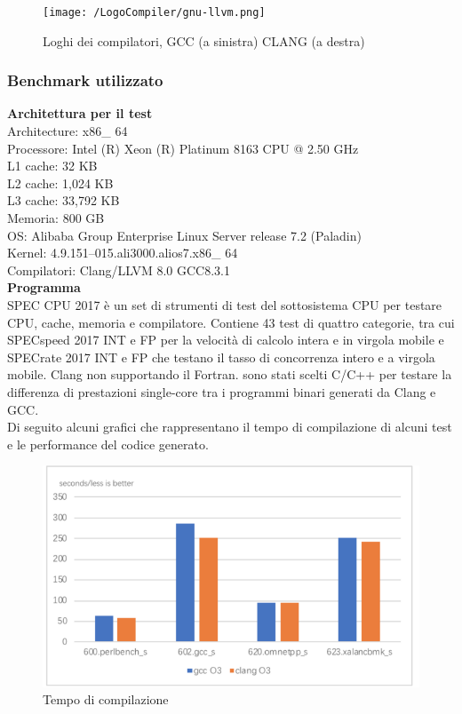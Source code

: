 \documentclass[12pt,a4paper]{report}
\begin{document}
\begin{figure}[h]
\centering
	\texttt{[image: /LogoCompiler/gnu-llvm.png]}
	\caption{Loghi dei compilatori, GCC (a sinistra) CLANG (a destra)}
	\label{Fig:LoghiCompilatori}
\end{figure}


\subsubsection{Benchmark utilizzato}
\textbf{Architettura per il test}\\

Architecture: x86\_ 64 \\
Processore: Intel (R) Xeon (R) Platinum 8163 CPU @ 2.50 GHz\\
L1 cache: 32 KB\\
L2 cache: 1,024 KB\\
L3 cache: 33,792 KB\\
Memoria: 800 GB\\
OS: Alibaba Group Enterprise Linux Server release 7.2 (Paladin)\\
Kernel: 4.9.151–015.ali3000.alios7.x86\_ 64\\
Compilatori: Clang/LLVM 8.0 GCC8.3.1\\

\textbf{Programma}\\
SPEC CPU 2017 è un set di strumenti di test del sottosistema CPU per testare CPU, cache, memoria e compilatore. Contiene 43 test di quattro categorie, tra cui SPECspeed 2017 INT e FP per la velocità  di calcolo intera e in virgola mobile e SPECrate 2017 INT e FP che testano il tasso di concorrenza intero e a virgola mobile. Clang non supportando il Fortran. sono stati scelti C/C++ per testare la differenza di prestazioni single-core tra i programmi binari generati da Clang e GCC.\\
Di seguito alcuni grafici che rappresentano il tempo di compilazione di alcuni test e le performance del codice generato.

\begin{figure}[h]
\centering
 \includegraphics[scale=0.4]{CompilatoriGrafici/timeComparison.png}
 \caption{Tempo di compilazione}
 \label{Fig:Tempo di compilazione}
\end{figure}
\end{document}
